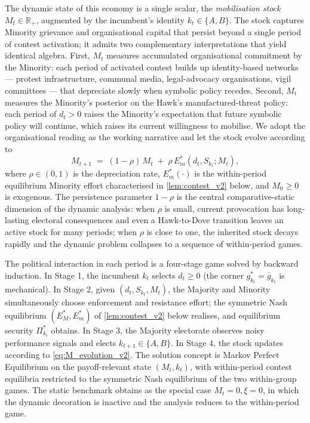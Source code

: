 \documentclass[11pt,twoside]{extarticle}
\begin{document}
The dynamic state of this economy is a single scalar, the \emph{mobilisation stock} $M_t\in\mathbb{R}_+$, augmented by the incumbent's identity $k_t\in\{A,B\}$. The stock captures Minority grievance and organisational capital that persist beyond a single period of contest activation; it admits two complementary interpretations that yield identical algebra. First, $M_t$ measures accumulated organisational commitment by the Minority: each period of activated contest builds up identity-based networks — protest infrastructure, communal media, legal-advocacy organisations, vigil committees — that depreciate slowly when symbolic policy recedes. Second, $M_t$ measures the Minority's posterior on the Hawk's manufactured-threat policy: each period of $d_t>0$ raises the Minority's expectation that future symbolic policy will continue, which raises its current willingness to mobilise. We adopt the organisational reading as the working narrative and let the stock evolve according to
\begin{equation}\label{eq:M_evolution_v2}
    M_{t+1}\;=\;(1-\rho)\,M_t\;+\;\rho\,E_m^*(d_t,S_{k_t};M_t),
\end{equation}
where $\rho\in(0,1)$ is the depreciation rate, $E_m^*(\cdot)$ is the within-period equilibrium Minority effort characterised in \autoref{lem:contest_v2} below, and $M_0\ge 0$ is exogenous. The persistence parameter $1-\rho$ is the central comparative-static dimension of the dynamic analysis: when $\rho$ is small, current provocation has long-lasting electoral consequences and even a Hawk-to-Dove transition leaves an active stock for many periods; when $\rho$ is close to one, the inherited stock decays rapidly and the dynamic problem collapses to a sequence of within-period games.

The political interaction in each period is a four-stage game solved by backward induction. In Stage 1, the incumbent $k_t$ selects $d_t\ge 0$ (the corner $g_{k_t}^*=\bar g_{k_t}$ is mechanical). In Stage 2, given $(d_t,S_{k_t},M_t)$, the Majority and Minority simultaneously choose enforcement and resistance effort; the symmetric Nash equilibrium $(E_M^*,E_m^*)$ of \autoref{lem:contest_v2} below realises, and equilibrium security $\Pi_{k_t}^*$ obtains. In Stage 3, the Majority electorate observes noisy performance signals and elects $k_{t+1}\in\{A,B\}$. In Stage 4, the stock updates according to \autoref{eq:M_evolution_v2}. The solution concept is Markov Perfect Equilibrium on the payoff-relevant state $(M_t,k_t)$, with within-period contest equilibria restricted to the symmetric Nash equilibrium of the two within-group games. The static benchmark obtains as the special case $M_t=0,\xi=0$, in which the dynamic decoration is inactive and the analysis reduces to the within-period game.
\end{document}
